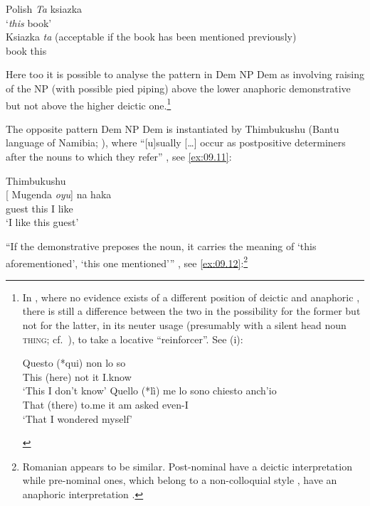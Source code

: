 \documentclass[output=paper]{langsci/langscibook}
\begin{document}
\ea Polish\label{ex:09.10}
	\ea
		\textit{Ta} ksiazka\\
		‘\textit{this} book’\\
	\ex
		\gll Ksiazka \textit{ta} (acceptable if the book has been mentioned previously)\\
			book this\\
	\z
\z

Here too it is possible to analyse the pattern in Dem NP
Dem as involving raising of the NP (with possible pied piping)
above the lower anaphoric demonstrative but not above the higher deictic
one.\footnote{In , where no evidence exists of a different 
    position of deictic and anaphoric , there is still a
    difference between the two in the possibility for the former but not for
    the latter, in its neuter usage (presumably with a silent head noun \textsc{thing};
    cf.\ \citealt{KayPol2009}), to take a locative \enquote{reinforcer}. See
    (i):

\begin{exe}
\begin{xlist}
	\ex
		\gll Questo (*qui) non lo so\\
			 This (here) not it I.know\\
		\glt ‘This I don’t know’
	\ex
		\gll Quello (*lì) me lo sono chiesto anch’io\\
			That (there) to.me it am asked even-I\\
		\glt ‘That I wondered myself’
\end{xlist}
\end{exe}}

The opposite pattern Dem NP Dem is instantiated by
Thimbukushu (Bantu language of Namibia; \citealt{Fisch1998}), where
\enquote{[u]sually  [\dots{}] occur as postpositive determiners after
the nouns to which they refer} \parencite[50]{Fisch1998}, see \eqref{ex:09.11}:

\ea Thimbukushu\label{ex:09.11} \parencite[50]{Fisch1998}\\
	\gll {}[ Mugenda \textit{oyu}] na haka\\
            {} guest this I like\\
	\glt ‘I like this guest’
\z

\enquote{If the demonstrative preposes the noun, it carries the meaning of
    \enquote*{this aforementioned}, \enquote*{this one mentioned}}
    \parencite[50]{Fisch1998}, see \eqref{ex:09.12}:\footnote{Romanian
        appears to be similar. Post-nominal  have a
    deictic interpretation while pre-nominal ones, which belong to a
non-colloquial style \parencite[cf.][n.\ 32]{Bruge2002}, have an anaphoric
interpretation \parencites[31]{Giusti2005}[299f]{Nicolae2013}.}
\end{document}
